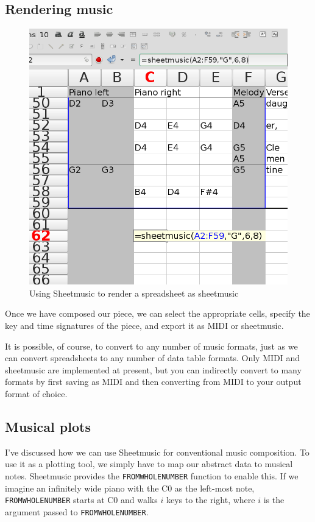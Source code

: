 \documentclass{acm_proc_article-sp}
\begin{document}
\subsection{Rendering music}
\begin{figure}
\includegraphics[width=\textwidth]{../sheetmusic/sheetmusic-function-call.png}
\caption{Using Sheetmusic to render a spreadsheet as sheetmusic}
\centering
\end{figure}

Once we have composed our piece, we can select the appropriate cells,
specify the key and time signatures of the piece, and export it as
MIDI or sheetmusic.

It is possible, of course, to convert to any number of music formats,
just as we can convert spreadsheets to any number of data table formats.
Only MIDI and sheetmusic are implemented at present, but you can
indirectly convert to many formats by first saving as MIDI and then
converting from MIDI to your output format of choice.

\subsection{Musical plots}
I've discussed how we can use Sheetmusic for conventional music
composition. To use it as a plotting tool, we simply have to map
our abstract data to musical notes. Sheetmusic provides the
\texttt{FROMWHOLENUMBER} function to enable this. If we imagine an
infinitely wide piano with the C0 as the left-most note,
\texttt{FROMWHOLENUMBER} starts at C0 and walks $i$ keys to the right,
where $i$ is the argument passed to \texttt{FROMWHOLENUMBER}.
\end{document}
